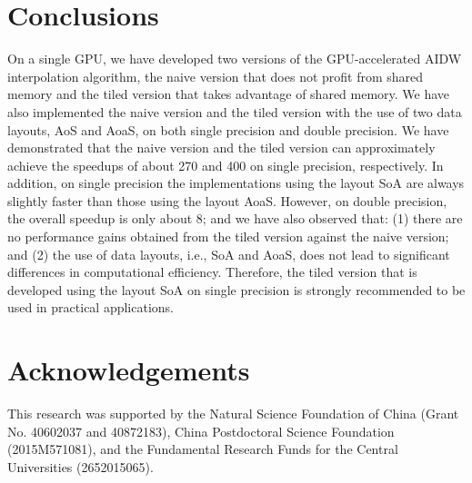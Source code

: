 \documentclass[fleqn,11pt]{wlscirep}
\begin{document}
\section{Conclusions}\label{sec6}
On a single GPU, we have developed two versions of the GPU-accelerated AIDW 
interpolation algorithm, the naive version that does not profit from shared 
memory and the tiled version that takes advantage of shared memory. We have 
also implemented the naive version and the tiled version with the use of two 
data layouts, AoS and AoaS, on both single precision and double precision. 
We have demonstrated that the naive version and the tiled version can 
approximately achieve the speedups of about 270 and 400 on single precision, 
respectively. In addition, on single precision the implementations using the 
layout SoA are always slightly faster than those using the layout AoaS. 
However, on double precision, the overall speedup is only about 8; and we 
have also observed that: (1) there are no performance gains obtained from 
the tiled version against the naive version; and (2) the use of data 
layouts, i.e., SoA and AoaS, does not lead to significant differences in 
computational efficiency. Therefore, the tiled version that is developed 
using the layout SoA on single precision is strongly recommended to be used 
in practical applications. 


\section*{Acknowledgements}
This research was supported by the Natural Science Foundation of China 
(Grant No. 40602037 and 40872183), China Postdoctoral Science Foundation 
(2015M571081), and the Fundamental Research Funds for the Central 
Universities (2652015065).



\end{document}

